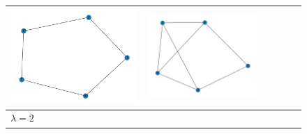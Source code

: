 \documentclass[11pt,a4paper,openright,oneside]{book}
\numberwithin{equation}{section}
\begin{document}
{\begin{figure}[h]
\begin{adjustwidth}{-3cm}{-3cm}
\begin{tabular}{>{\centering\arraybackslash}m{1.5cm} m{2.5cm} m{2.5cm} m{2.5cm} m{2.5cm} m{2.5cm}}
        \rule{0pt}{0.01cm} \includegraphics[width=\linewidth]{media/tnale/graph-4-tnale-1.png} \rule{0pt}{0.01cm}&
        \rule{0pt}{0.01cm} \includegraphics[width=\linewidth]{media/tnale/graph-5-tnale-1.png} \rule{0pt}{0.01cm}\\ \hline
        $\lambda = 2$ &

\end{tabular}
\end{adjustwidth}
\end{figure}}
\end{document}
